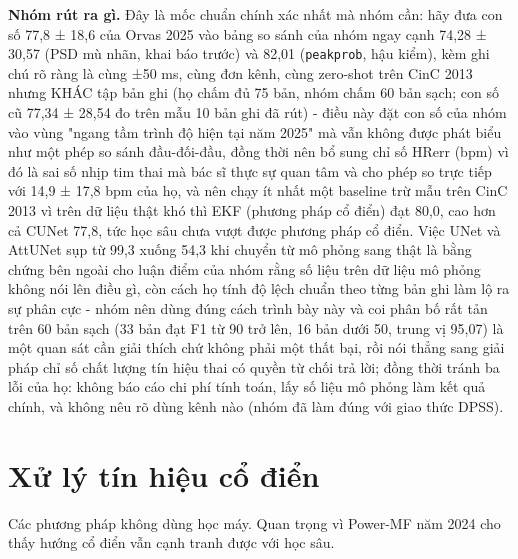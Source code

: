 \documentclass[12pt,a4paper]{article}
\begin{document}
\noindent \textbf{\color{tdtblue}Nhóm rút ra gì.} Đây là mốc chuẩn chính xác nhất mà nhóm cần: hãy đưa con số 77,8 ± 18,6 của Orvas 2025 vào bảng so sánh của nhóm ngay cạnh 74,28 ± 30,57 (PSD mù nhãn, khai báo trước) và 82,01 (\texttt{peakprob}, hậu kiểm), kèm ghi chú rõ ràng là cùng ±50 ms, cùng đơn kênh, cùng zero-shot trên CinC 2013 nhưng KHÁC tập bản ghi (họ chấm đủ 75 bản, nhóm chấm 60 bản sạch; con số cũ 77,34 ± 28,54 đo trên mẫu 10 bản ghi đã rút) - điều này đặt con số của nhóm vào vùng "ngang tầm trình độ hiện tại năm 2025" mà vẫn không được phát biểu như một phép so sánh đầu-đối-đầu, đồng thời nên bổ sung chỉ số HRerr (bpm) vì đó là sai số nhịp tim thai mà bác sĩ thực sự quan tâm và cho phép so trực tiếp với 14,9 ± 17,8 bpm của họ, và nên chạy ít nhất một baseline trừ mẫu trên CinC 2013 vì trên dữ liệu thật khó thì EKF (phương pháp cổ điển) đạt 80,0, cao hơn cả CUNet 77,8, tức học sâu chưa vượt được phương pháp cổ điển. Việc UNet và AttUNet sụp từ 99,3 xuống 54,3 khi chuyển từ mô phỏng sang thật là bằng chứng bên ngoài cho luận điểm của nhóm rằng số liệu trên dữ liệu mô phỏng không nói lên điều gì, còn cách họ tính độ lệch chuẩn theo từng bản ghi làm lộ ra sự phân cực - nhóm nên dùng đúng cách trình bày này và coi phân bố rất tản trên 60 bản sạch (33 bản đạt F1 từ 90 trở lên, 16 bản dưới 50, trung vị 95,07) là một quan sát cần giải thích chứ không phải một thất bại, rồi nói thẳng sang giải pháp chỉ số chất lượng tín hiệu thai có quyền từ chối trả lời; đồng thời tránh ba lỗi của họ: không báo cáo chi phí tính toán, lấy số liệu mô phỏng làm kết quả chính, và không nêu rõ dùng kênh nào (nhóm đã làm đúng với giao thức DPSS).\par\vspace{3pt}
\vspace{6pt}
\clearpage
\section{Xử lý tín hiệu cổ điển}
Các phương pháp không dùng học máy. Quan trọng vì Power-MF năm 2024 cho thấy hướng cổ điển vẫn cạnh tranh được với học sâu.
\end{document}
